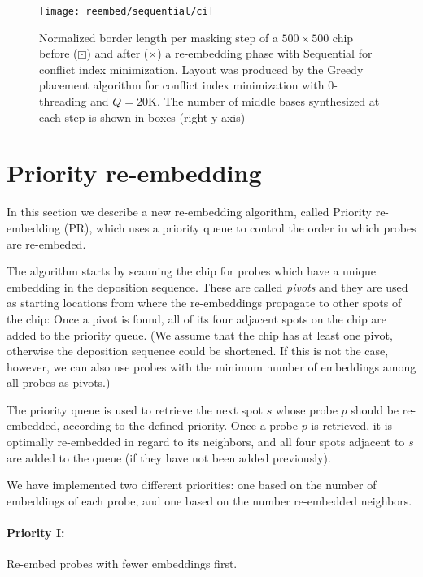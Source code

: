 \begin{figure}[t]\centering
\texttt{[image: reembed/sequential/ci]}
\caption{\label{fig:sequential-ci_blm}
  Normalized border length per masking step of a $500\times 500$ chip before
  ({\tiny $\boxdot$}) and after ({\tiny $\times$}) a re-embedding phase with
  Sequential for conflict index minimization. Layout was produced by the Greedy
  placement algorithm for conflict index minimization with $0$-threading and
  $Q=20$K. The number of middle bases synthesized at each step is shown in boxes
  (right y-axis)}
\end{figure}

\section{Priority re-embedding}
\label{sec:reembed_priority}

In this section we describe a new re-embedding algorithm, called Priority
re-embedding (PR), which uses a priority queue to control the order in which
probes are re-embeded.

The algorithm starts by scanning the chip for probes which have a unique
embedding in the deposition sequence. These are called \emph{pivots} and
they are used as starting locations from where the re-embeddings propagate to
other spots of the chip: Once a pivot is found, all of its four adjacent
spots on the chip are added to the priority queue. (We assume that the chip
has at least one pivot, otherwise the deposition sequence could be shortened. If
this is not the case, however, we can also use probes with the minimum number of
embeddings among all probes as pivots.)

The priority queue is used to retrieve the next spot $s$ whose probe $p$ should
be re-embedded, according to the defined priority. Once a probe $p$ is
retrieved, it is optimally re-embedded in regard to its neighbors, and all four
spots adjacent to $s$ are added to the queue (if they have not been added
previously).

We have implemented two different priorities: one based on the number of
embeddings of each probe, and one based on the number re-embedded neighbors.

\paragraph{Priority I:} Re-embed probes with fewer embeddings first.


